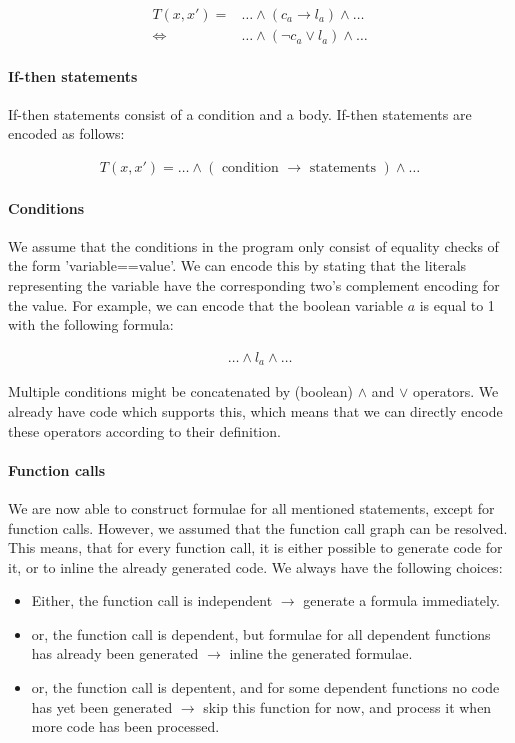 \documentclass[a4paper]{article}
\begin{document}
\begin{align*}
T(x,x') =& \ldots \land (c_a \rightarrow l_a) \land \ldots\\
\Leftrightarrow& \ldots \land (\lnot c_a \lor l_a) \land \ldots
\end{align*}

\paragraph{If-then statements}
If-then statements consist of a condition and a body. If-then statements are encoded as follows:

\begin{align*}
T(x,x') = \ldots \land (\text{ condition } \rightarrow \text{ statements }) \land \ldots
\end{align*}

\paragraph{Conditions}
We assume that the conditions in the program only consist of equality checks of the form 'variable==value'. We can encode this by stating that the literals representing the variable have the corresponding two's complement encoding for the value. For example, we can encode that the boolean variable $a$ is equal to 1 with the following formula:

\begin{align*}
\ldots \land l_a \land \ldots
\end{align*}

Multiple conditions might be concatenated by (boolean) $\land$ and $\lor$ operators. We already have code which supports this, which means that we can directly encode these operators according to their definition.

\paragraph{Function calls}
We are now able to construct formulae for all mentioned statements, except for function calls. However, we assumed that the function call graph can be resolved. This means, that for every function call, it is either possible to generate code for it, or to inline the already generated code. We always have the following choices:

\begin{itemize}
\item Either, the function call is independent $\rightarrow$ generate a formula immediately.
\item or, the function call is dependent, but formulae for all dependent functions has already been generated $\rightarrow$ inline the generated formulae.
\item or, the function call is depentent, and for some dependent functions no code has yet been generated $\rightarrow$ skip this function for now, and process it when more code has been processed.
\end{itemize}
\end{document}
